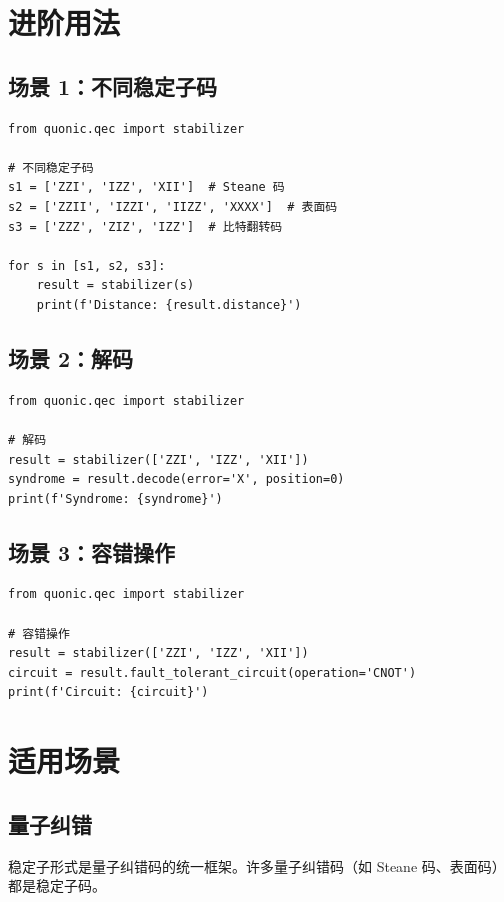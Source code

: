 \documentclass[12pt,a4paper]{article}
\begin{document}
\section{进阶用法}

\subsection{场景 1：不同稳定子码}

\begin{verbatim}
from quonic.qec import stabilizer

# 不同稳定子码
s1 = ['ZZI', 'IZZ', 'XII']  # Steane 码
s2 = ['ZZII', 'IZZI', 'IIZZ', 'XXXX']  # 表面码
s3 = ['ZZZ', 'ZIZ', 'IZZ']  # 比特翻转码

for s in [s1, s2, s3]:
    result = stabilizer(s)
    print(f'Distance: {result.distance}')
\end{verbatim}

\subsection{场景 2：解码}

\begin{verbatim}
from quonic.qec import stabilizer

# 解码
result = stabilizer(['ZZI', 'IZZ', 'XII'])
syndrome = result.decode(error='X', position=0)
print(f'Syndrome: {syndrome}')
\end{verbatim}

\subsection{场景 3：容错操作}

\begin{verbatim}
from quonic.qec import stabilizer

# 容错操作
result = stabilizer(['ZZI', 'IZZ', 'XII'])
circuit = result.fault_tolerant_circuit(operation='CNOT')
print(f'Circuit: {circuit}')
\end{verbatim}

\section{适用场景}

\subsection{量子纠错}

稳定子形式是量子纠错码的统一框架。许多量子纠错码（如 Steane 码、表面码）都是稳定子码。
\end{document}
